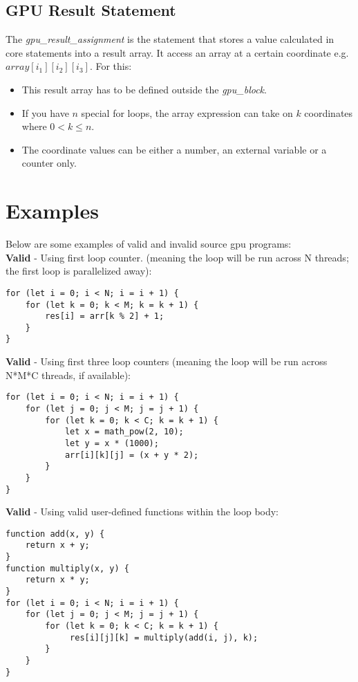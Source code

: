 \subsection*{GPU Result Statement}

The \textit{gpu\_result\_assignment} is the statement that stores a value calculated in core statements into a result array. 
It access an array at a certain coordinate e.g. ${array[{i_1}][{i_2}][{i_3}]}$. For this:

\begin{itemize}
    \item{This result array has to be defined outside the \textit{gpu\_block}.}
    \item{If you have ${n}$ special for loops, the array expression can take on ${k}$ coordinates where ${0 < k \leq n}$.} 
    \item{The coordinate values can be either a number, an external variable or a counter only.}
\end{itemize}

\section*{Examples}

Below are some examples of valid and invalid source gpu programs:\\

\textbf{Valid} - Using first loop counter. (meaning the loop will be run across N threads; the first loop is parallelized away):
\begin{verbatim}
for (let i = 0; i < N; i = i + 1) {
    for (let k = 0; k < M; k = k + 1) {
        res[i] = arr[k % 2] + 1;
    }
}
\end{verbatim}

\textbf{Valid} - Using first three loop counters (meaning the loop will be run across N*M*C threads, if available):
\begin{verbatim}
for (let i = 0; i < N; i = i + 1) {
    for (let j = 0; j < M; j = j + 1) {
        for (let k = 0; k < C; k = k + 1) {
            let x = math_pow(2, 10);
            let y = x * (1000);
            arr[i][k][j] = (x + y * 2);
        }
    }
}
\end{verbatim}

\textbf{Valid} - Using valid user-defined functions within the loop body:
\begin{verbatim}
function add(x, y) {
    return x + y;
}
function multiply(x, y) {
    return x * y;
}
for (let i = 0; i < N; i = i + 1) {
    for (let j = 0; j < M; j = j + 1) {
        for (let k = 0; k < C; k = k + 1) {
             res[i][j][k] = multiply(add(i, j), k);
        }
    }
}
\end{verbatim}

